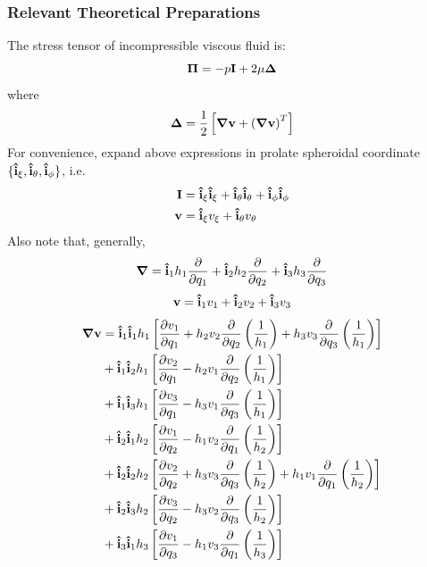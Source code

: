 \documentclass[fontsize=11pt, %
                             paper=a4, %
                             twoside, %
                             captions=tableheading,
                             index=totoc,
                             hyperref]{labbook}
\begin{document}
\begin{addmargin}[4cm]{0cm}
\subsubsection{Relevant Theoretical Preparations}
The stress tensor of incompressible viscous fluid is:
\begin{equation}
\mbox{\boldmath$ \Pi $} = -p\mathbf{I} + 2\mu \mbox{\boldmath$ \Delta $}
\end{equation}
where
\begin{equation}
\mbox{\boldmath$ \Delta $} = \frac{1}{2}\left[\mbox{\boldmath$ \nabla $} \mathbf{v}+ \left(\mbox{\boldmath$ \nabla $} \mathbf{v}\right)^T\right]
\end{equation}
For convenience, expand above expressions in prolate spheroidal coordinate $\{\mathbf{\hat{i}}_\xi,\mathbf{\hat{i}}_\theta, \mathbf{\hat{i}}_\phi\}$, i.e.
\begin{equation}
\begin{aligned}
\mathbf{I}&=\mathbf{\hat{i}}_\xi \mathbf{\hat{i}}_\xi + \mathbf{\hat{i}}_\theta \mathbf{\hat{i}}_\theta + \mathbf{\hat{i}}_\phi \mathbf{\hat{i}}_\phi\\
\mathbf{v}&=\mathbf{\hat{i}}_\xi v_\xi+\mathbf{\hat{i}}_\theta v_\theta
\end{aligned}
\end{equation}
Also note that, generally,
\begin{equation}
\mbox{\boldmath$ \nabla $} =\mathbf{\hat{i}}_1 h_1\frac{\partial }{\partial q_1}+\mathbf{\hat{i}}_2 h_2\frac{\partial }{\partial q_2}+\mathbf{\hat{i}}_3 h_3\frac{\partial }{\partial q_3}
\end{equation}
\begin{equation}
\mathbf{v}=\mathbf{\hat{i}}_1 v_1 +\mathbf{\hat{i}}_2 v_2 + \mathbf{\hat{i}}_3 v_3
\end{equation}
\begin{equation}
\begin{aligned}
\grad{\v v}&=\uv i_1 \uv i_1 h_1\left[\pd{v_1}{q_1}+h_2v_2\pd{}{q_2}\left(\frac{1}{h_1}\right)+h_3v_3\pd{}{q_3}\left(\frac{1}{h_1}\right)\right]\\
&+\uv i_1 \uv i_2 h_1\left[\pd{v_2}{q_1}-h_2v_1\pd{}{q_2}\left(\frac{1}{h_1}\right)\right]\\
&+\uv i_1 \uv i_3 h_1\left[\pd{v_3}{q_1}-h_3v_1\pd{}{q_3}\left(\frac{1}{h_1}\right)\right]\\
&+\uv i_2 \uv i_1 h_2\left[\pd{v_1}{q_2}-h_1v_2\pd{}{q_1}\left(\frac{1}{h_2}\right)\right]\\
&+\uv i_2 \uv i_2 h_2\left[\pd{v_2}{q_2}+h_3v_3\pd{}{q_3}\left(\frac{1}{h_2}\right)+h_1v_1\pd{}{q_1}\left(\frac{1}{h_2}\right)\right]\\
&+\uv i_2 \uv i_3 h_2\left[\pd{v_3}{q_2}-h_3v_2\pd{}{q_3}\left(\frac{1}{h_2}\right)\right]\\
&+\uv i_3 \uv i_1 h_3\left[\pd{v_1}{q_3}-h_1v_3\pd{}{q_1}\left(\frac{1}{h_3}\right)\right]\\

\end{aligned}
\end{equation}
\end{addmargin}
\end{document}
